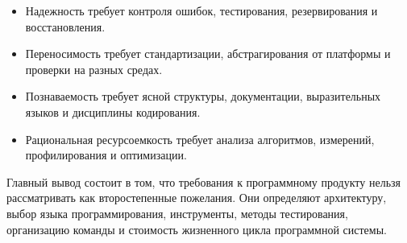 \documentclass[12pt,a4paper]{article}
\begin{document}
\begin{itemize}
    \item Надежность требует контроля ошибок, тестирования, резервирования и восстановления.
    \item Переносимость требует стандартизации, абстрагирования от платформы и проверки на разных средах.
    \item Познаваемость требует ясной структуры, документации, выразительных языков и дисциплины кодирования.
    \item Рациональная ресурсоемкость требует анализа алгоритмов, измерений, профилирования и оптимизации.
\end{itemize}

Главный вывод состоит в том, что требования к программному продукту нельзя рассматривать как второстепенные пожелания. Они определяют архитектуру, выбор языка программирования, инструменты, методы тестирования, организацию команды и стоимость жизненного цикла программной системы.
\end{document}
